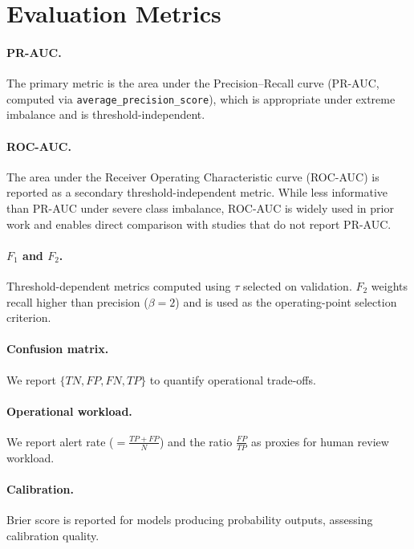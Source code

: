\section{Evaluation Metrics}
\label{sec:metrics}

\paragraph{PR-AUC.}
The primary metric is the area under the Precision--Recall curve (PR-AUC, computed via \texttt{average\_precision\_score}), which is appropriate under extreme imbalance and is threshold-independent.

\paragraph{ROC-AUC.}
The area under the Receiver Operating Characteristic curve (ROC-AUC) is reported as a secondary threshold-independent metric. While less informative than PR-AUC under severe class imbalance, ROC-AUC is widely used in prior work and enables direct comparison with studies that do not report PR-AUC.

\paragraph{\texorpdfstring{$F_1$}{F1} and \texorpdfstring{$F_2$}{F2}.}
Threshold-dependent metrics computed using $\tau$ selected on validation. $F_2$ weights recall higher than precision ($\beta=2$) and is used as the operating-point selection criterion.

\paragraph{Confusion matrix.}
We report $\{TN, FP, FN, TP\}$ to quantify operational trade-offs.

\paragraph{Operational workload.}
We report alert rate ($= \frac{TP+FP}{N}$) and the ratio $\frac{FP}{TP}$ as proxies for human review workload.

\paragraph{Calibration.}
Brier score is reported for models producing probability outputs, assessing calibration quality.

